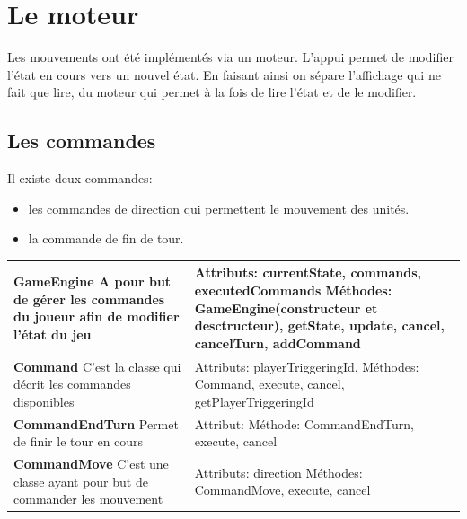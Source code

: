 \newpage





\section{Le moteur}

Les mouvements ont été implémentés via un moteur. L'appui permet de modifier l'état en cours vers un nouvel état. En faisant ainsi on sépare l'affichage qui ne fait que lire, du moteur qui permet à la fois de lire l'état et de le modifier.

\subsection{Les commandes}

Il existe deux commandes: 
\begin{itemize}
    \item les commandes de direction qui permettent le mouvement des unités.
    \item la commande de fin de tour.
\end{itemize}

\newpage

\phantom{Texte invisible parce que j'ai pas trouvé d'autre méthode pour mettre le tableau à la ligne.}

\begin{tabularx}{15 cm}{|X|X|}
\hline
\textbf{GameEngine} \newline A pour but de gérer les commandes du joueur afin de modifier l'état du jeu & Attributs: currentState, commands, executedCommands \newline Méthodes: GameEngine(constructeur et desctructeur), getState, update, cancel, cancelTurn, addCommand\\ 
\hline
\textbf{Command} \newline C'est la classe qui décrit les commandes disponibles  & Attributs: playerTriggeringId,  \newline Méthodes: Command, execute, cancel, getPlayerTriggeringId\\
\hline
\textbf{CommandEndTurn} \newline Permet de finir le tour en cours & Attribut:  \newline Méthode: CommandEndTurn, execute, cancel\\
\hline
\textbf{CommandMove} \newline C'est une classe ayant pour but de commander les mouvement & Attributs: direction
\newline Méthodes: CommandMove, execute, cancel\\
\hline

\end{tabularx}

\newpage






